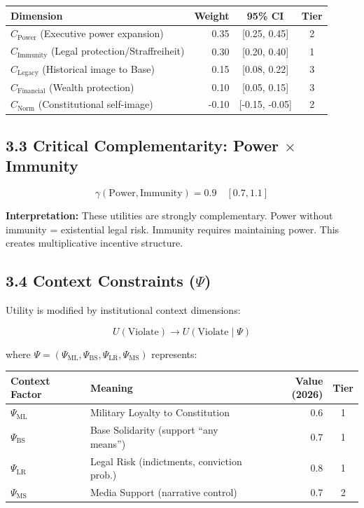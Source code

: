 \begin{table}[h]
\centering
\begin{tabular}{|l|r|c|c|}
\hline
\textbf{Dimension} & \textbf{Weight} & \textbf{95\% CI} & \textbf{Tier} \\
\hline
$C_{\text{Power}}$ (Executive power expansion) & 0.35 & [0.25, 0.45] & 2 \\
$C_{\text{Immunity}}$ (Legal protection/Straffreiheit) & 0.30 & [0.20, 0.40] & 1 \\
$C_{\text{Legacy}}$ (Historical image to Base) & 0.15 & [0.08, 0.22] & 3 \\
$C_{\text{Financial}}$ (Wealth protection) & 0.10 & [0.05, 0.15] & 3 \\
$C_{\text{Norm}}$ (Constitutional self-image) & -0.10 & [-0.15, -0.05] & 2 \\
\hline
\end{tabular}
\end{table}

\subsection{3.3 Critical Complementarity: Power $\times$ Immunity}

\begin{equation}
\gamma(\text{Power}, \text{Immunity}) = 0.9 \quad [0.7, 1.1]
\end{equation}

\textbf{Interpretation:} These utilities are strongly complementary. Power without immunity = existential legal risk. Immunity requires maintaining power. This creates multiplicative incentive structure.

\subsection{3.4 Context Constraints ($\Psi$)}

Utility is modified by institutional context dimensions:

\begin{equation}
U(\text{Violate}) \to U(\text{Violate} \mid \Psi)
\end{equation}

where $\Psi = (\Psi_{\text{ML}}, \Psi_{\text{BS}}, \Psi_{\text{LR}}, \Psi_{\text{MS}})$ represents:

\begin{table}[h]
\centering
\begin{tabular}{|l|l|r|c|}
\hline
\textbf{Context Factor} & \textbf{Meaning} & \textbf{Value (2026)} & \textbf{Tier} \\
\hline
$\Psi_{\text{ML}}$ & Military Loyalty to Constitution & 0.6 & 1 \\
$\Psi_{\text{BS}}$ & Base Solidarity (support ``any means'') & 0.7 & 1 \\
$\Psi_{\text{LR}}$ & Legal Risk (indictments, conviction prob.) & 0.8 & 1 \\
$\Psi_{\text{MS}}$ & Media Support (narrative control) & 0.7 & 2 \\
\hline
\end{tabular}
\end{table}

